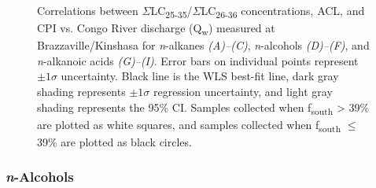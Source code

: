 \begin{figure}[p]
	\caption[Correlations between concentration, ACL, CPI, and discharge]{Correlations between $\Sigma$LC\textsubscript{25-35}/$\Sigma$LC\textsubscript{26-36} concentrations, ACL, and CPI vs. Congo River discharge (Q\textsubscript{w}) measured at Brazzaville/Kinshasa for \textit{n}-alkanes \textit{(A)--(C)}, \textit{n}-alcohols \textit{(D)--(F)}, and \textit{n}-alkanoic acids \textit{(G)--(I)}. Error bars on individual points represent $\pm 1 \sigma$ uncertainty. Black line is the WLS best-fit line, dark gray shading represents $\pm 1 \sigma$  regression uncertainty, and light gray shading represents the 95\% CI. Samples collected when f\textsubscript{south} > 39\% are plotted as white squares, and samples collected when f\textsubscript{south} $\leq$ 39\% are plotted as black circles.}
	\label{Ch4Fig:5} 
\end{figure}

\subsubsection{\textit{n}-Alcohols}

